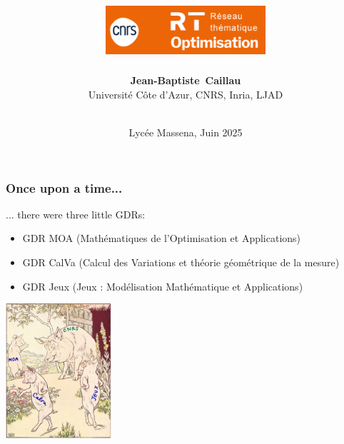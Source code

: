 \documentclass[9pt]{beamer}
\title{%
\includegraphics[height=1.8cm]{logo-rt-opti}}
\author{\textbf{Jean-Baptiste~Caillau}\\
Universit\'e C\^ote d'Azur, CNRS, Inria, LJAD}
\date{\textbf{\emphc{De la g\'eom\'etrie \`a la pelle (et r\'eciproquement)}}\\ Lyc\'ee Massena, Juin 2025}
\begin{document}

\begin{frame}
\frametitle{\bf Once upon a time...}
 
... there were three little GDRs:
\begin{itemize}
  \item GDR MOA (Math\'ematiques de l'Optimisation et Applications)
  \item GDR CalVa (Calcul des Variations et th\'eorie g\'eom\'etrique de la mesure)
  \item GDR Jeux (Jeux : Mod\'elisation Math\'ematique et Applications) 
\end{itemize}
 
\centering \includegraphics[height=5.0cm]{3-pigs}

\end{frame}
\end{document}

